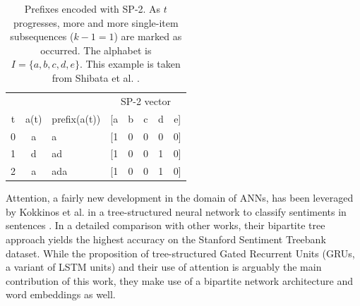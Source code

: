 \begin{table}[ht!]
    \centering
    \begin{tabular}{cclccccc}
        \hline
          &      &              & \multicolumn{5}{c}{SP-2 vector}\\
        t & a(t) & prefix(a(t)) & [a & b & c & d & e]\\
        \hline
        0 & a    & a            & [1 & 0 & 0 & 0 & 0]\\
        1 & d    & ad           & [1 & 0 & 0 & 1 & 0]\\
        2 & a    & ada          & [1 & 0 & 0 & 1 & 0]\\
        \hline
    \end{tabular}
    \caption{Prefixes encoded with SP-2. As $t$ progresses, more and more single-item subsequences ($k-1=1$) are marked as occurred. The alphabet is $I=\{a,b,c,d,e\}$. This example is taken from Shibata et al.  \cite{shibata2016bipartite}.}
    \label{tab:sp2-encoding}
\end{table}

Attention, a fairly new development in the domain of ANNs, has been leveraged by Kokkinos et al. in a tree-structured neural network to classify sentiments in sentences \cite{kokkinos2017structural}. In a detailed comparison with other works, their bipartite tree approach yields the highest accuracy on the Stanford Sentiment Treebank dataset. While the proposition of tree-structured Gated Recurrent Units (GRUs, a variant of LSTM units) and their use of attention is arguably the main contribution of this work, they make use of a bipartite network architecture and word embeddings as well.